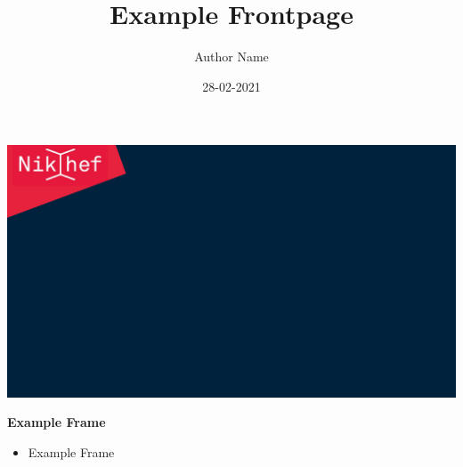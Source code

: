 \documentclass[aspectratio=169]{beamer}
\title{Example Frontpage}
\author{Author Name}
\institute{Nikhef}
\date{28-02-2021}
\begin{document}
{
\usebackgroundtemplate
{\includegraphics[width=\paperwidth,height=\paperheight,keepaspectratio]{theme/frontpage.pdf}}
\frame{\titlepage}
}

\begin{frame}{\textbf{Example Frame}}

    \begin{itemize}
        \item Example Frame
    \end{itemize}

\end{frame}
\end{document}
